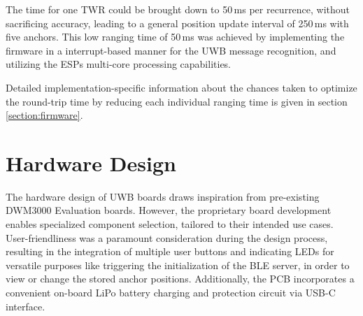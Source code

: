 \documentclass[conference, a4paper]{IEEEtran}
\begin{document}
The time for one \ac{TWR} could be brought down to 50\,ms per recurrence, without sacrificing accuracy,
leading to a general position update interval of 250\,ms with five anchors. 
This low ranging time of 50\,ms was achieved by implementing the firmware in a interrupt-based manner for the \ac{UWB} message recognition, and utilizing the ESPs multi-core processing capabilities.

Detailed implementation-specific information about the chances taken to optimize the round-trip time by reducing each individual ranging time
is given in section \ref{section:firmware}.


\section{Hardware Design}\label{section:hardware}
The hardware design of \ac{UWB} boards draws inspiration from pre-existing DWM3000 Evaluation
boards.
However, the proprietary board development enables specialized component selection, tailored to their intended use cases.
User-friendliness was a paramount consideration during the design process,
resulting in the integration of multiple user buttons and indicating LEDs for versatile purposes like triggering the initialization of the \ac{BLE} server, in order to view or change the stored anchor positions. 
Additionally, the PCB incorporates a convenient on-board LiPo battery charging and protection circuit via USB-C interface.
\end{document}
